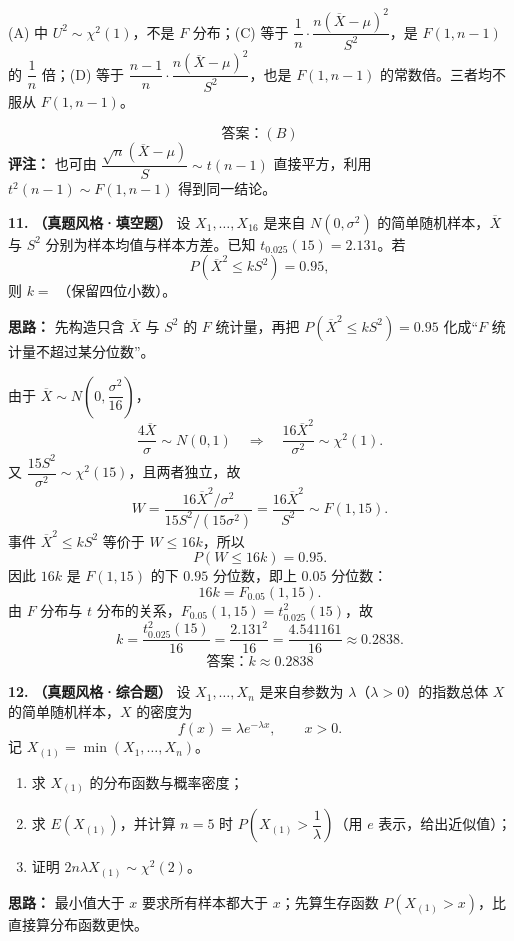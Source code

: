 (A) 中 $U^2\sim\chi^2(1)$，不是 $F$ 分布；(C) 等于 $\dfrac1n\cdot\dfrac{n(\overline{X}-\mu)^2}{S^2}$，是 $F(1,n-1)$ 的 $\dfrac1n$ 倍；(D) 等于 $\dfrac{n-1}{n}\cdot\dfrac{n(\overline{X}-\mu)^2}{S^2}$，也是 $F(1,n-1)$ 的常数倍。三者均不服从 $F(1,n-1)$。

\[
\boxed{\text{答案：}(B)}
\]
\textbf{评注：} 也可由 $\dfrac{\sqrt{n}(\overline{X}-\mu)}{S}\sim t(n-1)$ 直接平方，利用 $t^2(n-1)\sim F(1,n-1)$ 得到同一结论。
\else \answerarea[8] \fi%

\textbf{11.} \textbf{（真题风格·填空题）} 设 $X_1,\ldots,X_{16}$ 是来自 $N(0,\sigma^2)$ 的简单随机样本，$\overline{X}$ 与 $S^2$ 分别为样本均值与样本方差。已知 $t_{0.025}(15)=2.131$。若
\[
P\!\left(\overline{X}^2\leq kS^2\right)=0.95,
\]
则 $k=$ \underline{\qquad}（保留四位小数）。

\ifshowsolutions%
\textbf{思路：} 先构造只含 $\overline{X}$ 与 $S^2$ 的 $F$ 统计量，再把 $P(\overline{X}^2\leq kS^2)=0.95$ 化成“$F$ 统计量不超过某分位数”。

由于 $\overline{X}\sim N\!\left(0,\dfrac{\sigma^2}{16}\right)$，
\[
\frac{4\overline{X}}{\sigma}\sim N(0,1)
\quad\Rightarrow\quad
\frac{16\overline{X}^2}{\sigma^2}\sim\chi^2(1).
\]
又 $\dfrac{15S^2}{\sigma^2}\sim\chi^2(15)$，且两者独立，故
\[
W=\frac{16\overline{X}^2/\sigma^2}{15S^2/(15\sigma^2)}
=\frac{16\overline{X}^2}{S^2}\sim F(1,15).
\]
事件 $\overline{X}^2\leq kS^2$ 等价于 $W\leq 16k$，所以
\[
P(W\leq 16k)=0.95.
\]
因此 $16k$ 是 $F(1,15)$ 的下 $0.95$ 分位数，即上 $0.05$ 分位数：
\[
16k=F_{0.05}(1,15).
\]
由 $F$ 分布与 $t$ 分布的关系，$F_{0.05}(1,15)=t_{0.025}^2(15)$，故
\[
k=\frac{t_{0.025}^2(15)}{16}
=\frac{2.131^2}{16}
=\frac{4.541161}{16}
\approx0.2838.
\]
\[
\boxed{\text{答案：}k\approx0.2838}
\]
\else \answerarea[8] \fi%

\textbf{12.} \textbf{（真题风格·综合题）} 设 $X_1,\ldots,X_n$ 是来自参数为 $\lambda$（$\lambda>0$）的指数总体 $X$ 的简单随机样本，$X$ 的密度为
\[
f(x)=\lambda e^{-\lambda x},\qquad x>0.
\]
记 $X_{(1)}=\min(X_1,\ldots,X_n)$。
\begin{enumerate}[label=(\arabic*)]
    \item 求 $X_{(1)}$ 的分布函数与概率密度；
    \item 求 $E(X_{(1)})$，并计算 $n=5$ 时 $P\!\left(X_{(1)}>\dfrac{1}{\lambda}\right)$（用 $e$ 表示，给出近似值）；
    \item 证明 $2n\lambda X_{(1)}\sim\chi^2(2)$。
\end{enumerate}

\ifshowsolutions%
\textbf{思路：} 最小值大于 $x$ 要求所有样本都大于 $x$；先算生存函数 $P(X_{(1)}>x)$，比直接算分布函数更快。

